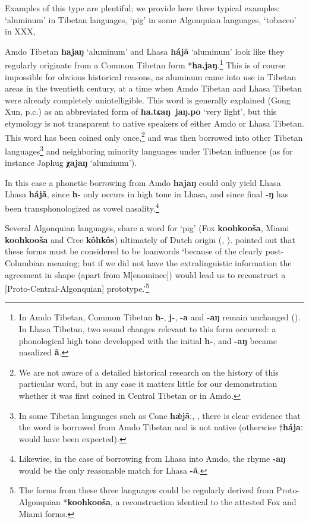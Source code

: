 \documentclass[oneside,a4paper,11pt]{article}
\newcommand{\ipa}[1]{\textbf{{\phon\mbox{#1}}}} %
\begin{document}
Examples of this type are plentiful; we provide here three typical examples: `aluminum' in Tibetan languages, `pig' in some Algonquian languages, `tobacco' in XXX,

Amdo Tibetan \ipa{hajaŋ} `aluminum' and Lhasa \ipa{hájã} `aluminum' look like they regularly originate from a Common Tibetan form *\ipa{ha.jaŋ}.\footnote{In Amdo Tibetan, Common Tibetan \ipa{h-}, \ipa{j-}, \ipa{-a} and \ipa{-aŋ} remain unchanged (\citealt{gong16amdo}). In Lhasa Tibetan, two sound changes relevant to this form occurred: a phonological high tone developped with the initial \ipa{h-}, and \ipa{-aŋ} became nasalized \ipa{ã}.} This is of course impossible for obvious historical reasons, as aluminum came into use in Tibetan areas in the twentieth century, at a time when Amdo Tibetan and Lhasa Tibetan were already completely unintelligible. This word is generally explained (Gong Xun, p.c.) as an abbreviated form of \ipa{ha.tɕaŋ jaŋ.po} `very light', but this etymology is not transparent to native speakers of either Amdo or Lhasa Tibetan. This word has been coined only once,\footnote{We are not aware of a detailed historical research on the history of this particular word, but in any case it matters little for our demonstration whether it was first coined in Central Tibetan or in Amdo.} and was then borrowed into other Tibetan languages\footnote{In some Tibetan languages such as Cone \ipa{hæ̀jãː}, \citet[306]{jacques14cone}, there is clear evidence that the word is borrowed from Amdo Tibetan and is not native (otherwise $\dagger$\ipa{hájaː} would have been expected). } and neighboring minority languages under Tibetan influence (as for instance Japhug \ipa{χajaŋ} `aluminum').

In this case a phonetic borrowing from Amdo \ipa{hajaŋ} could only yield Lhasa Lhasa \ipa{hájã}, since \ipa{h-} only occurs in high tone in Lhasa, and since final \ipa{-ŋ} has been transphonologized as vowel nasality.\footnote{Likewise, in the case of borrowing from Lhasa into Amdo, the rhyme \ipa{-aŋ} would be the only reasonable match for Lhasa \ipa{-ã}.} 

Several Algonquian languages, share a word for `pig' (Fox \ipa{koohkooša}, Miami \ipa{koohkooša} and Cree \ipa{kôhkôs}) ultimately of Dutch origin (\citealt{goddard74dutch}, \citealt{costa13borrowing}). \citet[266]{hockett57k} pointed out that these forms must be considered to be loanwords `because of the clearly post-Columbian meaning; but if we did not have the extralinguistic information the agreement in shape (apart from M[enominee]) would lead us to reconstruct a [Proto-Central-Algonquian] prototype.'\footnote{The forms from these three languages could be regularly derived from Proto-Algonquian *\ipa{koohkooša}, a reconstruction identical to the attested Fox and Miami forms.}
\end{document}
